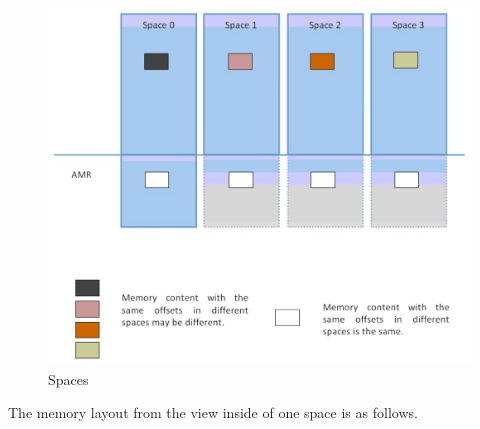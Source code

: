 \documentclass[a4paper]{article}
\begin{document}
\begin{figure}[htbp]
\begin{center}
  \includegraphics[width=5.8in]{figure/spaces.eps}
  \caption{Spaces}
  \label{fig:c0-spaces}
\end{center}
\end{figure}

The memory layout from the view inside of one space is as follows.
\end{document}
